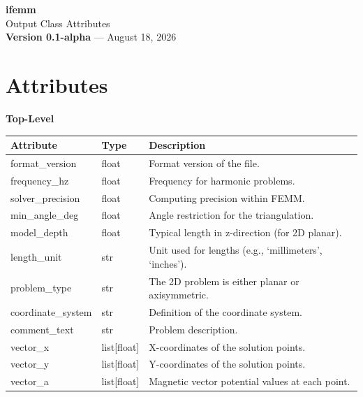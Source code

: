 \documentclass[11pt,a4paper]{article}
\begin{document}
\begin{center}
{\LARGE \textbf{ifemm}} \\[4pt]
{\large Output Class Attributes} \\[4pt]
{\footnotesize\textbf{Version 0.1-alpha} --- August 18, 2026}
\end{center}

\section*{Attributes}

\vspace{0.5cm}
\noindent\textbf{Top-Level}

\begin{table}[h]
  \centering
  \renewcommand{\arraystretch}{1.3}
  \footnotesize
  \begin{tabularx}{\textwidth}{>{\raggedright\arraybackslash}p{3.5cm} 
                  >{\raggedright\arraybackslash}p{2.5cm}
                  >{\raggedright\arraybackslash}X}
    \toprule
    \textbf{Attribute} & \textbf{Type} & \textbf{Description} \\
    \midrule
    format\_version & float & Format version of the file. \\
    frequency\_hz & float & Frequency for harmonic problems. \\
    solver\_precision & float & Computing precision within FEMM\@. \\
    min\_angle\_deg & float & Angle restriction for the triangulation. \\
    model\_depth & float & Typical length in z-direction (for 2D planar). \\
    length\_unit & str & Unit used for lengths (e.g., `millimeters', `inches'). \\
    problem\_type & str & The 2D problem is either planar or axisymmetric. \\
    coordinate\_system & str & Definition of the coordinate system. \\
    comment\_text & str & Problem description. \\
    vector\_x & list[float] & X-coordinates of the solution points. \\
    vector\_y & list[float] & Y-coordinates of the solution points. \\
    vector\_a & list[float] & Magnetic vector potential values at each point. \\
    \bottomrule
  \end{tabularx}
\end{table}
\end{document}
